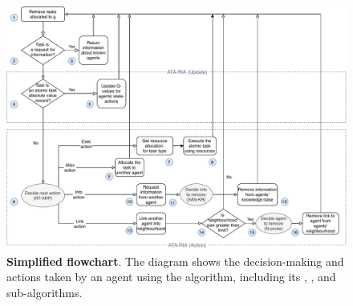 \begin{figure}[ht]
	\centering
	\includegraphics[width=0.8\linewidth, trim={65pt 0pt 65pt 0pt, clip}]{ataria-simplified}
	\caption{\textbf{Simplified \acronymATARIA{}{} flowchart}. The diagram shows the decision-making and actions taken by an agent using the \acronymATARIA{}{} algorithm, including its \acronymRewardTrendsAlgorithm{}{}, \acronymNeighbourhoodPruningAlgorithm{}{}, and \acronymMemoryRetention{}{} sub-algorithms.
}
	\label{fig:ataria-simplified}
\end{figure}

